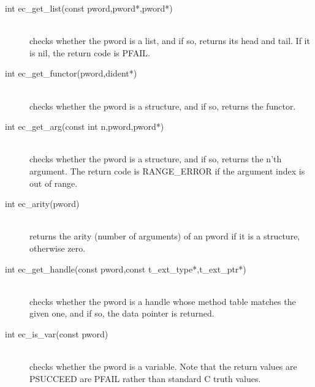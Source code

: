 \begin{description}
\item[int		ec_get_list(const pword,pword*,pword*)]\ \\
	checks whether the {\eclipse} pword is a list, and if so,
	returns its head and tail. If it is nil, the return code is PFAIL.

\item[int		ec_get_functor(pword,dident*)]\ \\
	checks whether the {\eclipse} pword is a structure, and if so,
	returns the functor.

\item[int		ec_get_arg(const int n,pword,pword*)]\ \\
	checks whether the {\eclipse} pword is a structure, and if so,
	returns the n'th argument. The return code is RANGE_ERROR
	if the argument index is out of range.

\item[int		ec_arity(pword)]\ \\
	returns the arity (number of arguments) of an {\eclipse} pword
	if it is a structure, otherwise zero.

\item[int		ec_get_handle(const pword,const t_ext_type*,t_ext_ptr*)]\ \\
	checks whether the {\eclipse} pword is a handle whose method table
	matches the given one, and if so, the data pointer is returned.

\item[int		ec_is_var(const pword)]\ \\
	checks whether the {\eclipse} pword is a variable.
	Note that the return values are PSUCCEED are PFAIL
	rather than standard C truth values.

\end{description}


